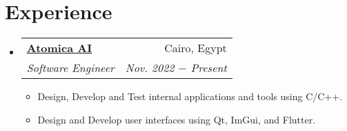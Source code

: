 \documentclass[letterpaper, 11pt]{article}
\makeatletter
\newcommand{\experience}[6] {
  \vspace{-1pt}\item
  \begin{tabular*}{0.97\textwidth}[t]{l@{\extracolsep{\fill}}r}
		#1 \href{#2}{\textbf{\color{RoyalBlue}#3}} & #4 \\
    \textit{\small #5} & \textit{\small #6} \\
  \end{tabular*}
  \vspace{-8pt}
}
\newcommand{\subexperience}[1] {
\item\small
  {#1}
  \vspace{-2pt}
}
\makeatother
\begin{document}
\section{Experience}
\begin{itemize}[leftmargin=*]
  \experience
	{\faIcon{briefcase}}
  {https://atomica.ai/}{Atomica AI}{Cairo, Egypt}
  {Software Engineer}{Nov. 2022 $-$ Present}

  \begin{itemize}
    \subexperience
    {Design, Develop and Test internal applications and tools using C/C++.}
    \subexperience
    {Design and Develop user interfaces using Qt, ImGui, and Flutter.}
  \end{itemize}\vspace{-4pt}
\end{itemize}

\end{document}
